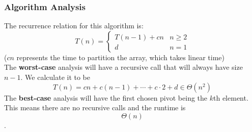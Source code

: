 \documentclass{report}
\begin{document}
\subsubsection{Algorithm Analysis}
The recurrence relation for this algorithm is:
\[ T(n) = \begin{cases} 
      T(n-1) + cn & n \geq 2 \\
      d & n = 1
   \end{cases}
\]
($cn$ represents the time to partition the array, which takes linear time)\\
The \textbf{worst-case} analysis will have a recursive call that will always have size $n-1$. We calculate it to be
$$T(n) = cn + c(n-1) + \cdots + c\cdot 2 + d \in \Theta(n^2)$$
The \textbf{best-case} analysis will have the first chosen pivot being the $k$th element. This means there are no recursive calls and the runtime is $$\Theta(n)$$.
\end{document}
